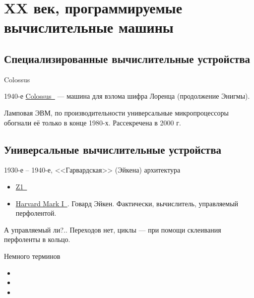 \documentclass[xetex,aspectratio=43]{beamer}
\begin{document}
\section{XX век, программируемые вычислительные машины}

\subsection{Специализированные вычислительные устройства}

\begin{frame}{Colossus}
	
		1940-е \href{https://en.wikipedia.org/wiki/Colossus_computer}{Colossus~\extlink}
		--- машина для взлома шифра Лоренца (продолжение Энигмы).
		
		Ламповая ЭВМ, по производительности универсальные микропроцессоры
		обогнали её только в конце 1980-х. Рассекречена в 2000 г.

\end{frame}

\subsection{Универсальные вычислительные устройства}

\begin{frame}{1930-е -- 1940-е, <<Гарвардская>> (Эйкена) архитектура}
		\begin{itemize}
			\item
			\href{https://en.wikipedia.org/wiki/Z1_(computer)}{Z1~\extlink}
		\pause
			\item
			\href{https://en.wikipedia.org/wiki/Harvard_Mark_I}{Harvard Mark I~\extlink}.
			Говард Эйкен. Фактически, вычислитель, управляемый перфолентой.
		\end{itemize}
				
		\begin{figure}
			
		\end{figure}
		
		\pause
		А управляемый ли?.. Переходов нет, циклы --- при помощи склеивания перфоленты в кольцо.
\end{frame}

\begin{frame}{Немного терминов}
	\begin{itemize}
		\item
		\item
		\item
	\end{itemize}
\end{frame}
\end{document}
